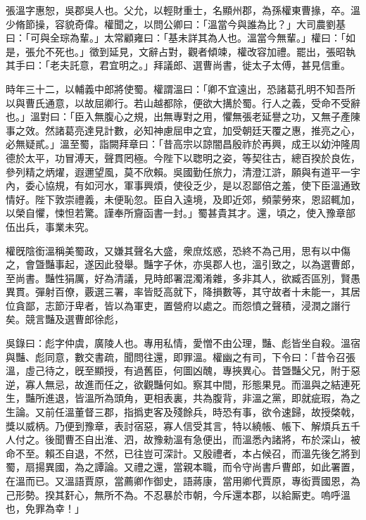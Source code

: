 
\begin{pinyinscope}
張溫字惠恕，吳郡吳人也。父允，以輕財重士，名顯州郡，為孫權東曹掾，卒。溫少脩節操，容貌奇偉。權聞之，以問公卿曰：「溫當今與誰為比？」大司農劉基曰：「可與全琮為輩。」太常顧雍曰：「基未詳其為人也。溫當今無輩。」權曰：「如是，張允不死也。」徵到延見，文辭占對，觀者傾竦，權改容加禮。罷出，張昭執其手曰：「老夫託意，君宜明之。」拜議郎、選曹尚書，徙太子太傅，甚見信重。

時年三十二，以輔義中郎將使蜀。權謂溫曰：「卿不宜遠出，恐諸葛孔明不知吾所以與曹氏通意，以故屈卿行。若山越都除，便欲大搆於蜀。行人之義，受命不受辭也。」溫對曰：「臣入無腹心之規，出無專對之用，懼無張老延譽之功，又無子產陳事之效。然諸葛亮達見計數，必知神慮屈申之宜，加受朝廷天覆之惠，推亮之心，必無疑貳。」溫至蜀，詣闕拜章曰：「昔高宗以諒闇昌殷祚於再興，成王以幼沖隆周德於太平，功冒溥天，聲貫罔極。今陛下以聦明之姿，等契往古，總百揆於良佐，參列精之炳燿，遐邇望風，莫不欣賴。吳國勤任旅力，清澄江滸，願與有道平一宇內，委心協規，有如河水，軍事興煩，使役乏少，是以忍鄙倍之羞，使下臣溫通致情好。陛下敦崇禮義，未便恥忽。臣自入遠境，及即近郊，頻蒙勞來，恩詔輒加，以榮自懼，悚怛若驚。謹奉所齎函書一封。」蜀甚貴其才。還，頃之，使入豫章部伍出兵，事業未究。

權旣陰銜溫稱美蜀政，又嫌其聲名大盛，衆庶炫惑，恐終不為己用，思有以中傷之，會曁豔事起，遂因此發舉。豔字子休，亦吳郡人也，溫引致之，以為選曹郎，至尚書。豔性狷厲，好為清議，見時郎署混濁淆雜，多非其人，欲臧否區別，賢愚異貫。彈射百僚，覈選三署，率皆貶高就下，降損數等，其守故者十未能一，其居位貪鄙，志節汙卑者，皆以為軍吏，置營府以處之。而怨憤之聲積，浸潤之譖行矣。競言豔及選曹郎徐彪，

吳錄曰：彪字仲虞，廣陵人也。專用私情，愛憎不由公理，豔、彪皆坐自殺。溫宿與豔、彪同意，數交書疏，聞問往還，即罪溫。權幽之有司，下令曰：「昔令召張溫，虛己待之，旣至顯授，有過舊臣，何圖凶醜，專挾異心。昔曁豔父兄，附于惡逆，寡人無忌，故進而任之，欲觀豔何如。察其中間，形態果見。而溫與之結連死生，豔所進退，皆溫所為頭角，更相表裏，共為腹背，非溫之黨，即就疵瑕，為之生論。又前任溫董督三郡，指撝吏客及殘餘兵，時恐有事，欲令速歸，故授棨戟，獎以威柄。乃便到豫章，表討宿惡，寡人信受其言，特以繞帳、帳下、解煩兵五千人付之。後聞曹丕自出淮、泗，故豫勑溫有急便出，而溫悉內諸將，布於深山，被命不至。賴丕自退，不然，已往豈可深計。又殷禮者，本占候召，而溫先後乞將到蜀，扇揚異國，為之譚論。又禮之還，當親本職，而令守尚書戶曹郎，如此署置，在溫而已。又溫語賈原，當薦卿作御史，語蔣康，當用卿代賈原，專衒賈國恩，為己形勢。揆其姧心，無所不為。不忍暴於巿朝，今斥還本郡，以給厮吏。嗚呼溫也，免罪為幸！」


\end{pinyinscope}
